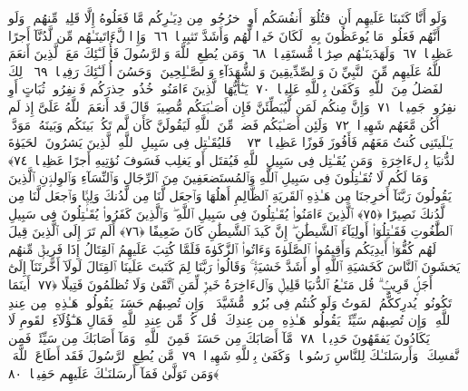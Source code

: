  وَلَو أَنَّا كَتَبنَا عَلَيهِم أَنِ ٱقتُلُوٓا۟ أَنفُسَكُم أَوِ ٱخرُجُوا۟ مِن دِيَـٰرِكُم مَّا فَعَلُوهُ إِلَّا قَلِيلٌۭ مِّنهُم ۖ وَلَو أَنَّهُم فَعَلُوا۟ مَا يُوعَظُونَ بِهِۦ لَكَانَ خَيرًۭا لَّهُم وَأَشَدَّ تَثبِيتًۭا ﴿٦٦﴾
 وَإِذًۭا لَّءَاتَينَـٰهُم مِّن لَّدُنَّآ أَجرًا عَظِيمًۭا ﴿٦٧﴾
 وَلَهَدَينَـٰهُم صِرَٰطًۭا مُّستَقِيمًۭا ﴿٦٨﴾
 وَمَن يُطِعِ ٱللَّهَ وَٱلرَّسُولَ فَأُو۟لَـٰٓئِكَ مَعَ ٱلَّذِينَ أَنعَمَ ٱللَّهُ عَلَيهِم مِّنَ ٱلنَّبِيِّۦنَ وَٱلصِّدِّيقِينَ وَٱلشُّهَدَآءِ وَٱلصَّـٰلِحِينَ ۚ وَحَسُنَ أُو۟لَـٰٓئِكَ رَفِيقًۭا ﴿٦٩﴾
 ذَٟلِكَ ٱلفَضلُ مِنَ ٱللَّهِ ۚ وَكَفَىٰ بِٱللَّهِ عَلِيمًۭا ﴿٧٠﴾
 يَـٰٓأَيُّهَا ٱلَّذِينَ ءَامَنُوا۟ خُذُوا۟ حِذرَكُم فَٱنفِرُوا۟ ثُبَاتٍ أَوِ ٱنفِرُوا۟ جَمِيعًۭا ﴿٧١﴾
 وَإِنَّ مِنكُم لَمَن لَّيُبَطِّئَنَّ فَإِن أَصَـٰبَتكُم مُّصِيبَةٌۭ قَالَ قَد أَنعَمَ ٱللَّهُ عَلَىَّ إِذ لَم أَكُن مَّعَهُم شَهِيدًۭا ﴿٧٢﴾
 وَلَئِن أَصَـٰبَكُم فَضلٌۭ مِّنَ ٱللَّهِ لَيَقُولَنَّ كَأَن لَّم تَكُنۢ بَينَكُم وَبَينَهُۥ مَوَدَّةٌۭ يَـٰلَيتَنِى كُنتُ مَعَهُم فَأَفُوزَ فَوزًا عَظِيمًۭا ﴿٧٣﴾
 ۞ فَليُقَـٰتِل فِى سَبِيلِ ٱللَّهِ ٱلَّذِينَ يَشرُونَ ٱلحَيَوٰةَ ٱلدُّنيَا بِٱلءَاخِرَةِ ۚ وَمَن يُقَـٰتِل فِى سَبِيلِ ٱللَّهِ فَيُقتَل أَو يَغلِب فَسَوفَ نُؤتِيهِ أَجرًا عَظِيمًۭا ﴿٧٤﴾
 وَمَا لَكُم لَا تُقَـٰتِلُونَ فِى سَبِيلِ ٱللَّهِ وَٱلمُستَضعَفِينَ مِنَ ٱلرِّجَالِ وَٱلنِّسَآءِ وَٱلوِلدَٟنِ ٱلَّذِينَ يَقُولُونَ رَبَّنَآ أَخرِجنَا مِن هَـٰذِهِ ٱلقَريَةِ ٱلظَّالِمِ أَهلُهَا وَٱجعَل لَّنَا مِن لَّدُنكَ وَلِيًّۭا وَٱجعَل لَّنَا مِن لَّدُنكَ نَصِيرًا ﴿٧٥﴾
 ٱلَّذِينَ ءَامَنُوا۟ يُقَـٰتِلُونَ فِى سَبِيلِ ٱللَّهِ ۖ وَٱلَّذِينَ كَفَرُوا۟ يُقَـٰتِلُونَ فِى سَبِيلِ ٱلطَّٰغُوتِ فَقَـٰتِلُوٓا۟ أَولِيَآءَ ٱلشَّيطَٰنِ ۖ إِنَّ كَيدَ ٱلشَّيطَٰنِ كَانَ ضَعِيفًا ﴿٧٦﴾
 أَلَم تَرَ إِلَى ٱلَّذِينَ قِيلَ لَهُم كُفُّوٓا۟ أَيدِيَكُم وَأَقِيمُوا۟ ٱلصَّلَوٰةَ وَءَاتُوا۟ ٱلزَّكَوٰةَ فَلَمَّا كُتِبَ عَلَيهِمُ ٱلقِتَالُ إِذَا فَرِيقٌۭ مِّنهُم يَخشَونَ ٱلنَّاسَ كَخَشيَةِ ٱللَّهِ أَو أَشَدَّ خَشيَةًۭ ۚ وَقَالُوا۟ رَبَّنَا لِمَ كَتَبتَ عَلَينَا ٱلقِتَالَ لَولَآ أَخَّرتَنَآ إِلَىٰٓ أَجَلٍۢ قَرِيبٍۢ ۗ قُل مَتَـٰعُ ٱلدُّنيَا قَلِيلٌۭ وَٱلءَاخِرَةُ خَيرٌۭ لِّمَنِ ٱتَّقَىٰ وَلَا تُظلَمُونَ فَتِيلًا ﴿٧٧﴾
 أَينَمَا تَكُونُوا۟ يُدرِككُّمُ ٱلمَوتُ وَلَو كُنتُم فِى بُرُوجٍۢ مُّشَيَّدَةٍۢ ۗ وَإِن تُصِبهُم حَسَنَةٌۭ يَقُولُوا۟ هَـٰذِهِۦ مِن عِندِ ٱللَّهِ ۖ وَإِن تُصِبهُم سَيِّئَةٌۭ يَقُولُوا۟ هَـٰذِهِۦ مِن عِندِكَ ۚ قُل كُلٌّۭ مِّن عِندِ ٱللَّهِ ۖ فَمَالِ هَـٰٓؤُلَآءِ ٱلقَومِ لَا يَكَادُونَ يَفقَهُونَ حَدِيثًۭا ﴿٧٨﴾
 مَّآ أَصَابَكَ مِن حَسَنَةٍۢ فَمِنَ ٱللَّهِ ۖ وَمَآ أَصَابَكَ مِن سَيِّئَةٍۢ فَمِن نَّفسِكَ ۚ وَأَرسَلنَـٰكَ لِلنَّاسِ رَسُولًۭا ۚ وَكَفَىٰ بِٱللَّهِ شَهِيدًۭا ﴿٧٩﴾
 مَّن يُطِعِ ٱلرَّسُولَ فَقَد أَطَاعَ ٱللَّهَ ۖ وَمَن تَوَلَّىٰ فَمَآ أَرسَلنَـٰكَ عَلَيهِم حَفِيظًۭا ﴿٨٠﴾
